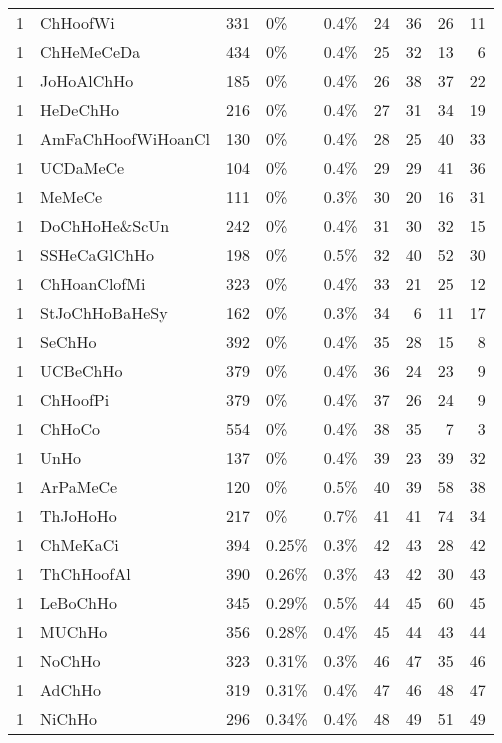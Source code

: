 \begin{longtable}{lllllrrrr}
  1 & ChHoofWi & 331 & 0\% & 0.4\% &  24 &  36 &  26 &  11 \\ 
  1 & ChHeMeCeDa & 434 & 0\% & 0.4\% &  25 &  32 &  13 &   6 \\ 
  1 & JoHoAlChHo & 185 & 0\% & 0.4\% &  26 &  38 &  37 &  22 \\ 
  1 & HeDeChHo & 216 & 0\% & 0.4\% &  27 &  31 &  34 &  19 \\ 
  1 & AmFaChHoofWiHoanCl & 130 & 0\% & 0.4\% &  28 &  25 &  40 &  33 \\ 
  1 & UCDaMeCe & 104 & 0\% & 0.4\% &  29 &  29 &  41 &  36 \\ 
  1 & MeMeCe & 111 & 0\% & 0.3\% &  30 &  20 &  16 &  31 \\ 
  1 & DoChHoHe\&ScUn & 242 & 0\% & 0.4\% &  31 &  30 &  32 &  15 \\ 
  1 & SSHeCaGlChHo & 198 & 0\% & 0.5\% &  32 &  40 &  52 &  30 \\ 
  1 & ChHoanClofMi & 323 & 0\% & 0.4\% &  33 &  21 &  25 &  12 \\ 
  1 & StJoChHoBaHeSy & 162 & 0\% & 0.3\% &  34 &   6 &  11 &  17 \\ 
  1 & SeChHo & 392 & 0\% & 0.4\% &  35 &  28 &  15 &   8 \\ 
  1 & UCBeChHo & 379 & 0\% & 0.4\% &  36 &  24 &  23 &   9 \\ 
  1 & ChHoofPi & 379 & 0\% & 0.4\% &  37 &  26 &  24 &   9 \\ 
  1 & ChHoCo & 554 & 0\% & 0.4\% &  38 &  35 &   7 &   3 \\ 
  1 & UnHo & 137 & 0\% & 0.4\% &  39 &  23 &  39 &  32 \\ 
  1 & ArPaMeCe & 120 & 0\% & 0.5\% &  40 &  39 &  58 &  38 \\ 
  1 & ThJoHoHo & 217 & 0\% & 0.7\% &  41 &  41 &  74 &  34 \\ 
  1 & ChMeKaCi & 394 & 0.25\% & 0.3\% &  42 &  43 &  28 &  42 \\ 
  1 & ThChHoofAl & 390 & 0.26\% & 0.3\% &  43 &  42 &  30 &  43 \\ 
  1 & LeBoChHo & 345 & 0.29\% & 0.5\% &  44 &  45 &  60 &  45 \\ 
  1 & MUChHo & 356 & 0.28\% & 0.4\% &  45 &  44 &  43 &  44 \\ 
  1 & NoChHo & 323 & 0.31\% & 0.3\% &  46 &  47 &  35 &  46 \\ 
  1 & AdChHo & 319 & 0.31\% & 0.4\% &  47 &  46 &  48 &  47 \\ 
  1 & NiChHo & 296 & 0.34\% & 0.4\% &  48 &  49 &  51 &  49 \\ 

\end{longtable}
